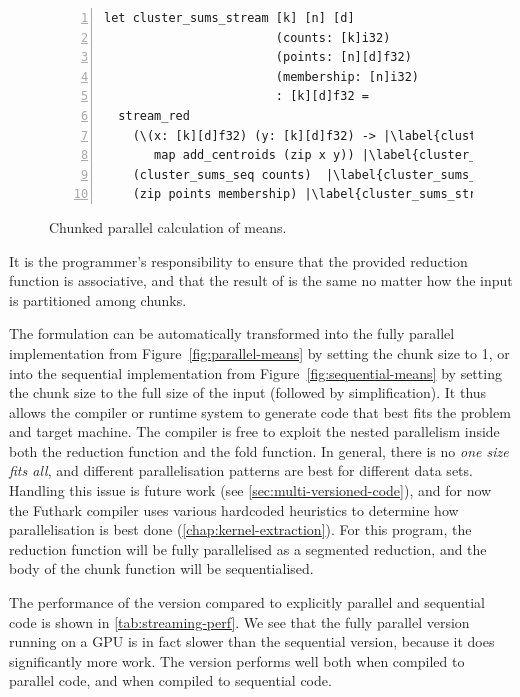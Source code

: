 \begin{figure}
\begin{lstlisting}[numbers=left,escapechar=|]
let cluster_sums_stream [k] [n] [d]
                        (counts: [k]i32)
                        (points: [n][d]f32)
                        (membership: [n]i32)
                        : [k][d]f32 =
  stream_red
    (\(x: [k][d]f32) (y: [k][d]f32) -> |\label{cluster_sums_stream_op_begin}|
       map add_centroids (zip x y)) |\label{cluster_sums_stream_op_end}|
    (cluster_sums_seq counts)  |\label{cluster_sums_stream_chunk}|
    (zip points membership) |\label{cluster_sums_stream_zip}|
\end{lstlisting}
\caption{Chunked parallel calculation of means.}
\label{fig:stream-means}
\end{figure}

It is the programmer's responsibility to ensure that the provided
reduction function is associative, and that the result of
\StreamRed{} is the same no matter how the input is partitioned
among chunks.

The \StreamRed{} formulation can be automatically transformed into the
fully parallel implementation from Figure~\ref{fig:parallel-means} by
setting the chunk size to 1, or into the sequential implementation
from Figure~\ref{fig:sequential-means} by setting the chunk size to
the full size of the input (followed by simplification).  It thus
allows the compiler or runtime system to generate code that best fits
the problem and target machine.  The compiler is free to exploit the
nested parallelism inside both the reduction function and the fold
function.  In general, there is no \textit{one size fits all}, and
different parallelisation patterns are best for different data sets.
Handling this issue is future work (see
\cref{sec:multi-versioned-code}), and for now the Futhark compiler
uses various hardcoded heuristics to determine how parallelisation is
best done (\cref{chap:kernel-extraction}).  For this program, the
reduction function will be fully parallelised as a segmented
reduction, and the body of the chunk function will be sequentialised.

The performance of the \StreamRed{} version compared to explicitly
parallel and sequential code is shown in \cref{tab:streaming-perf}.  We
see that the fully parallel version running on a GPU is in fact slower
than the sequential version, because it does significantly more work.
The \StreamRed{} version performs well both when compiled to parallel
code, and when compiled to sequential code.

